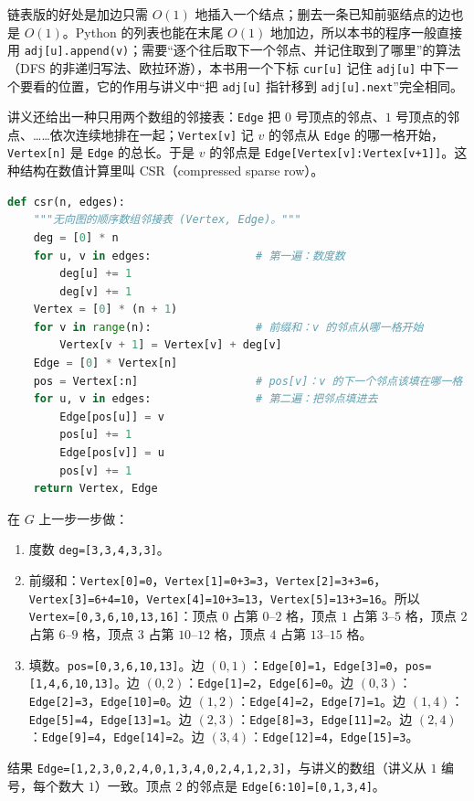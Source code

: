 链表版的好处是加边只需 $O(1)$ 地插入一个结点；删去一条已知前驱结点的边也是 $O(1)$。Python 的列表也能在末尾 $O(1)$ 地加边，所以本书的程序一般直接用 \texttt{adj[u].append(v)}；需要“逐个往后取下一个邻点、并记住取到了哪里”的算法（DFS 的非递归写法、欧拉环游），本书用一个下标 \texttt{cur[u]} 记住 \texttt{adj[u]} 中下一个要看的位置，它的作用与讲义中“把 \texttt{adj[u]} 指针移到 \texttt{adj[u].next}”完全相同。


讲义还给出一种只用两个数组的邻接表：\texttt{Edge} 把 $0$ 号顶点的邻点、$1$ 号顶点的邻点、……依次连续地排在一起；\texttt{Vertex[v]} 记 $v$ 的邻点从 \texttt{Edge} 的哪一格开始，\texttt{Vertex[n]} 是 \texttt{Edge} 的总长。于是 $v$ 的邻点是 \texttt{Edge[Vertex[v]:Vertex[v+1]]}。这种结构在数值计算里叫 CSR（compressed sparse row）。

\begin{lstlisting}[language=Python]
def csr(n, edges):
    """无向图的顺序数组邻接表 (Vertex, Edge)。"""
    deg = [0] * n
    for u, v in edges:                # 第一遍：数度数
        deg[u] += 1
        deg[v] += 1
    Vertex = [0] * (n + 1)
    for v in range(n):                # 前缀和：v 的邻点从哪一格开始
        Vertex[v + 1] = Vertex[v] + deg[v]
    Edge = [0] * Vertex[n]
    pos = Vertex[:n]                  # pos[v]：v 的下一个邻点该填在哪一格
    for u, v in edges:                # 第二遍：把邻点填进去
        Edge[pos[u]] = v
        pos[u] += 1
        Edge[pos[v]] = u
        pos[v] += 1
    return Vertex, Edge
\end{lstlisting}

在 $G$ 上一步一步做：
\begin{enumerate}
\item 度数 \texttt{deg=[3,3,4,3,3]}。
\item 前缀和：\texttt{Vertex[0]=0}，\texttt{Vertex[1]=0+3=3}，\texttt{Vertex[2]=3+3=6}，\texttt{Vertex[3]=6+4=10}，\texttt{Vertex[4]=10+3=13}，\texttt{Vertex[5]=13+3=16}。所以 \texttt{Vertex=[0,3,6,10,13,16]}：顶点 $0$ 占第 $0$–$2$ 格，顶点 $1$ 占第 $3$–$5$ 格，顶点 $2$ 占第 $6$–$9$ 格，顶点 $3$ 占第 $10$–$12$ 格，顶点 $4$ 占第 $13$–$15$ 格。
\item 填数。\texttt{pos=[0,3,6,10,13]}。边 $(0,1)$：\texttt{Edge[0]=1}，\texttt{Edge[3]=0}，\texttt{pos=[1,4,6,10,13]}。边 $(0,2)$：\texttt{Edge[1]=2}，\texttt{Edge[6]=0}。边 $(0,3)$：\texttt{Edge[2]=3}，\texttt{Edge[10]=0}。边 $(1,2)$：\texttt{Edge[4]=2}，\texttt{Edge[7]=1}。边 $(1,4)$：\texttt{Edge[5]=4}，\texttt{Edge[13]=1}。边 $(2,3)$：\texttt{Edge[8]=3}，\texttt{Edge[11]=2}。边 $(2,4)$：\texttt{Edge[9]=4}，\texttt{Edge[14]=2}。边 $(3,4)$：\texttt{Edge[12]=4}，\texttt{Edge[15]=3}。
\end{enumerate}
结果 \texttt{Edge=[1,2,3,0,2,4,0,1,3,4,0,2,4,1,2,3]}，与讲义的数组（讲义从 $1$ 编号，每个数大 $1$）一致。顶点 $2$ 的邻点是 \texttt{Edge[6:10]=[0,1,3,4]}。

